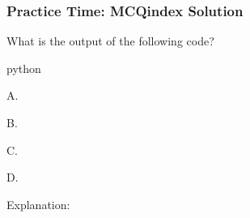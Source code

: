 \begin{{frame}}[fragile]
    \frametitle{{Practice Time: MCQ{index} Solution}}
    What is the output of the following code?
    \begin{{minted}}{{python}}
    \end{{minted}}
    \begin{{itemize}}
        \item A.
        \item B.
        \item C.
        \item D.
    \end{{itemize}}

    Explanation:
\end{{frame}}
